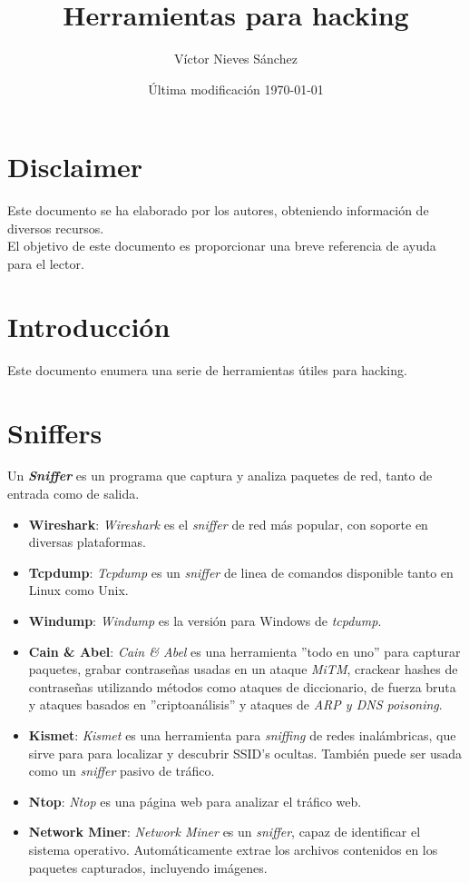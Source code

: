 \documentclass[bibliography=totocnumbered]{scrartcl}
\title{Herramientas para hacking}
\author{Víctor Nieves Sánchez}
\date{Última modificación \today{}}
\begin{document}
\maketitle
\section*{Disclaimer}
Este documento se ha elaborado por los autores, obteniendo información de diversos recursos.\\

El objetivo de este documento es proporcionar una breve referencia de ayuda para el lector.

\newpage
\tableofcontents

\newpage

\newpage
\section{Introducción}
Este documento enumera una serie de herramientas útiles para hacking.

\section{Sniffers}
Un \textbf{\textit{Sniffer}} es un programa que captura y analiza paquetes de red, tanto de entrada como de salida.
\begin{itemize}
    \item \textbf{Wireshark}\parencite{wireshark}: \textit{Wireshark} es el \textit{sniffer} de red más popular, con soporte en diversas plataformas.
    \item \textbf{Tcpdump}\parencite{tcpdump}: \textit{Tcpdump} es un \textit{sniffer} de linea de comandos disponible tanto en Linux como Unix.
    \item \textbf{Windump}\parencite{windump}: \textit{Windump} es la versión para Windows de \textit{tcpdump}\parencite{tcpdump}.
    \item \textbf{Cain \& Abel}\parencite{cain}: \textit{Cain \& Abel} es una herramienta ''todo en uno'' para capturar paquetes, grabar contraseñas usadas en un ataque \textit{MiTM}\parencite{mitm}, crackear hashes de contraseñas utilizando métodos como ataques de diccionario, de fuerza bruta y ataques basados en ''criptoanálisis'' y ataques de \textit{ARP\parencite{arp} y DNS\parencite{dns} poisoning}.
    \item \textbf{Kismet}\parencite{kismet}: \textit{Kismet} es una herramienta para \textit{sniffing} de redes inalámbricas, que sirve para para localizar y descubrir SSID's ocultas. También puede ser usada como un \textit{sniffer} pasivo de tráfico.
    \item \textbf{Ntop}\parencite{ntop}: \textit{Ntop} es una página web para analizar el tráfico web.
    \item \textbf{Network Miner}\parencite{networkminer}: \textit{Network Miner} es un \textit{sniffer}, capaz de identificar el sistema operativo. Automáticamente extrae los archivos contenidos en los paquetes capturados, incluyendo imágenes. 
\end{itemize}
\end{document}
